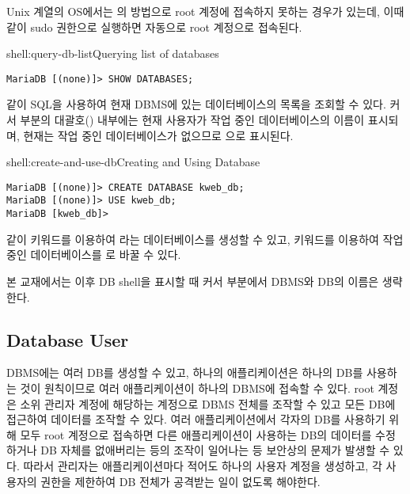 Unix 계열의 OS에서는 의 방법으로 root 계정에 접속하지 못하는 경우가 있는데, 이때 \과 같이 sudo 권한으로 실행하면 자동으로 root 계정으로 접속된다.

\begin{shell}{shell:query-db-list}{Querying list of databases}
\begin{verbatim}
MariaDB [(none)]> SHOW DATABASES;
\end{verbatim}
\end{shell}

\와 같이 SQL을 사용하여 현재 DBMS에 있는 데이터베이스의 목록을 조회할 수 있다. 커서 부분의 대괄호(\cd{[]}) 내부에는 현재 사용자가 작업 중인 데이터베이스의 이름이 표시되며, 현재는 작업 중인 데이터베이스가 없으므로 으로 표시된다.

\begin{shell}{shell:create-and-use-db}{Creating and Using Database}
\begin{verbatim}
MariaDB [(none)]> CREATE DATABASE kweb_db;
MariaDB [(none)]> USE kweb_db;
MariaDB [kweb_db]>
\end{verbatim}
\end{shell}

\와 같이  키워드를 이용하여 라는 데이터베이스를 생성할 수 있고,  키워드를 이용하여 작업 중인 데이터베이스를 로 바꿀 수 있다.

본 교재에서는 이후 DB shell을 표시할 때 커서 부분에서 DBMS와 DB의 이름은 생략한다.

\subsection*{Database User}

DBMS에는 여러 DB를 생성할 수 있고, 하나의 애플리케이션은 하나의 DB를 사용하는 것이 원칙이므로 여러 애플리케이션이 하나의 DBMS에 접속할 수 있다. root 계정은 소위 관리자 계정에 해당하는 계정으로 DBMS 전체를 조작할 수 있고 모든 DB에 접근하여 데이터를 조작할 수 있다. 여러 애플리케이션에서 각자의 DB를 사용하기 위해 모두 root 계정으로 접속하면 다른 애플리케이션이 사용하는 DB의 데이터를 수정하거나 DB 자체를 없애버리는 등의 조작이 일어나는 등 보안상의 문제가 발생할 수 있다. 따라서 관리자는 애플리케이션마다 적어도 하나의 사용자 계정을 생성하고, 각 사용자의 권한을 제한하여 DB 전체가 공격받는 일이 없도록 해야한다.

